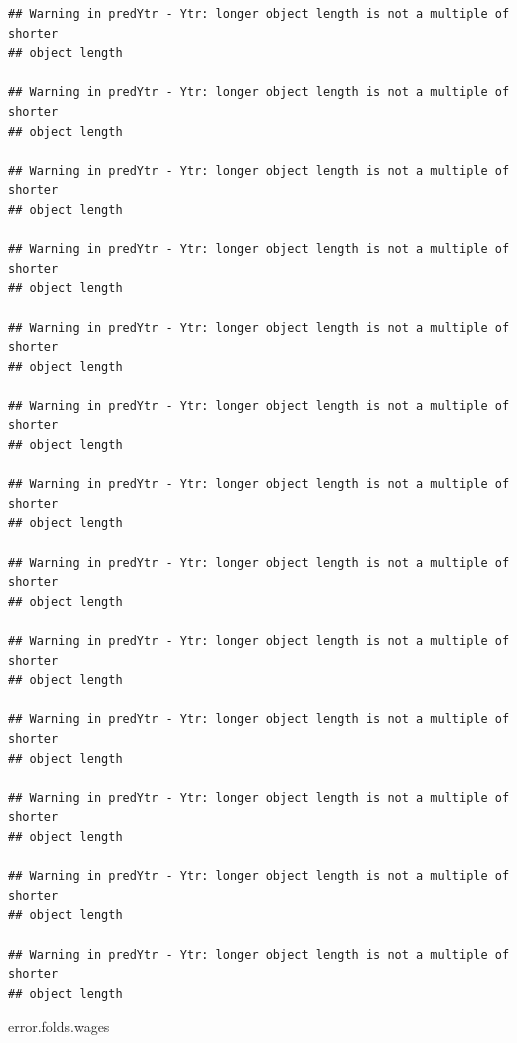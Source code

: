 \documentclass[]{article}
\newenvironment{Shaded}{\begin{snugshade}}{\end{snugshade}}
\newcommand{\NormalTok}[1]{#1}
\begin{document}
\begin{verbatim}
## Warning in predYtr - Ytr: longer object length is not a multiple of shorter
## object length

## Warning in predYtr - Ytr: longer object length is not a multiple of shorter
## object length

## Warning in predYtr - Ytr: longer object length is not a multiple of shorter
## object length

## Warning in predYtr - Ytr: longer object length is not a multiple of shorter
## object length

## Warning in predYtr - Ytr: longer object length is not a multiple of shorter
## object length

## Warning in predYtr - Ytr: longer object length is not a multiple of shorter
## object length

## Warning in predYtr - Ytr: longer object length is not a multiple of shorter
## object length

## Warning in predYtr - Ytr: longer object length is not a multiple of shorter
## object length

## Warning in predYtr - Ytr: longer object length is not a multiple of shorter
## object length

## Warning in predYtr - Ytr: longer object length is not a multiple of shorter
## object length

## Warning in predYtr - Ytr: longer object length is not a multiple of shorter
## object length

## Warning in predYtr - Ytr: longer object length is not a multiple of shorter
## object length

## Warning in predYtr - Ytr: longer object length is not a multiple of shorter
## object length
\end{verbatim}

\begin{Shaded}
\begin{Highlighting}[]
\NormalTok{error.folds.wages}
\end{Highlighting}
\end{Shaded}
\end{document}
